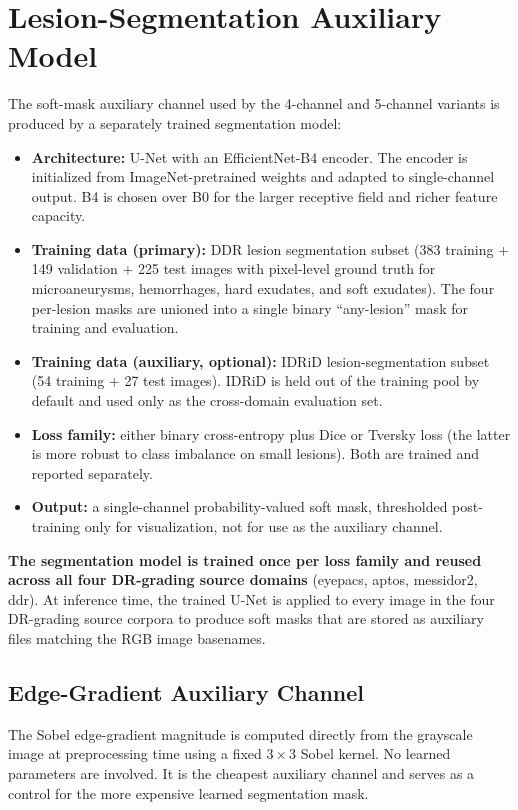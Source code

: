 \documentclass[11pt]{article}
\begin{document}
\section{Lesion-Segmentation Auxiliary Model}
The soft-mask auxiliary channel used by the 4-channel and 5-channel variants is produced by a separately trained segmentation model:
\begin{itemize}[leftmargin=*, topsep=0pt]
  \item \textbf{Architecture:} U-Net with an EfficientNet-B4 encoder. The encoder is initialized from ImageNet-pretrained weights and adapted to single-channel output. B4 is chosen over B0 for the larger receptive field and richer feature capacity.
  \item \textbf{Training data (primary):} DDR lesion segmentation subset (383 training + 149 validation + 225 test images with pixel-level ground truth for microaneurysms, hemorrhages, hard exudates, and soft exudates). The four per-lesion masks are unioned into a single binary ``any-lesion'' mask for training and evaluation.
  \item \textbf{Training data (auxiliary, optional):} IDRiD lesion-segmentation subset (54 training + 27 test images). IDRiD is held out of the training pool by default and used only as the cross-domain evaluation set.
  \item \textbf{Loss family:} either binary cross-entropy plus Dice or Tversky loss (the latter is more robust to class imbalance on small lesions). Both are trained and reported separately.
  \item \textbf{Output:} a single-channel probability-valued soft mask, thresholded post-training only for visualization, not for use as the auxiliary channel.
\end{itemize}

\textbf{The segmentation model is trained once per loss family and reused across all four DR-grading source domains} (eyepacs, aptos, messidor2, ddr). At inference time, the trained U-Net is applied to every image in the four DR-grading source corpora to produce soft masks that are stored as auxiliary files matching the RGB image basenames.

\subsection{Edge-Gradient Auxiliary Channel}
The Sobel edge-gradient magnitude is computed directly from the grayscale image at preprocessing time using a fixed $3\times 3$ Sobel kernel. No learned parameters are involved. It is the cheapest auxiliary channel and serves as a control for the more expensive learned segmentation mask.
\end{document}
